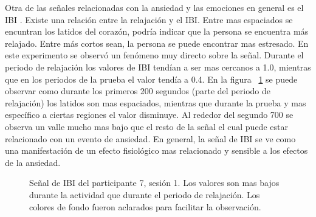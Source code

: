 Otra de las se\~nales relacionadas con la ansiedad y las emociones en general es el IBI \citep{Cinaz13}. Existe una relaci\'on entre la relajaci\'on y el IBI. Entre mas espaciados se encuntran los latidos del coraz\'on, podr\'ia indicar que la persona se encuentra m\'as relajado. Entre m\'as cortos sean, la persona se puede encontrar mas estresado. En este experimento se observ\'o un fen\'omeno muy directo sobre la se\~nal. Durante el periodo de relajaci\'on los valores de IBI tend\'ian a ser mas cercanos a 1.0, mientras que en los periodos de la prueba el valor tend\'ia a 0.4. En la figura ~\ref{fig:ibianxiety} se puede observar como durante los primeros 200 segundos (parte del periodo de relajaci\'on) los latidos son mas espaciados, mientras que durante la prueba y mas espec\'ifico a ciertas regiones el valor disminuye. Al rededor del segundo 700 se observa un valle mucho mas bajo que el resto de la se\~nal el cual puede estar relacionado con un evento de ansiedad. En general, la se\~nal de IBI se ve como una manifestaci\'on de un efecto fisiol\'ogico mas relacionado y sensible a los efectos de la ansiedad.

\begin{figure}[h!]
        \centering
        \caption{Se\~nal de IBI del participante 7, sesi\'on 1. Los valores son mas bajos durante la actividad que durante el periodo de relajaci\'on. Los colores de fondo fueron aclarados para facilitar la observaci\'on.}\label{fig:ibianxiety}
\end{figure}


